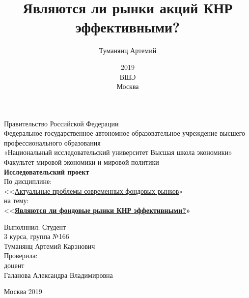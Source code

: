 \documentclass[a4paper,12pt]{article}
\title{Являются ли рынки акций КНР эффективными?}
\author{Туманянц Артемий}
\date{2019\\ВШЭ\\Москва}
\begin{document}
\begin{titlepage}
  \begin{center}
	Правительство Российской Федерации\\
	\vspace{1.5ex}
	Федеральное государственное автономное образовательное учреждение высшего профессионального образования\\
		\vspace{1.5ex}
	«Национальный исследовательский университет
Высшая школа экономики»\\
Факультет мировой экономики и мировой политики\\
		\vspace{5ex}
	\textbf{Исследовательский проект}\\
    	\vspace{5ex}
        По дисциплине:\\
<<\underline{Актуальные проблемы современных фондовых рынков}»\\
на тему:\\
<<{\bfseries\underline{Являются ли фондовые рынки КНР эффективными?}»}
\end{center}
\vspace{13ex}
\begin{flushright}
	\noindent
	Выполннил: Студент\\
    3 курса, группа №166\\
    Туманянц Артемий Карэнович\\
	\vspace{1.5ex}
    Проверила:\\
    доцент\\
    Галанова Александра Владимировна
\end{flushright}
\begin{center}
	\vfill
	Москва 2019
\end{center}
\end{titlepage}

\end{document}
